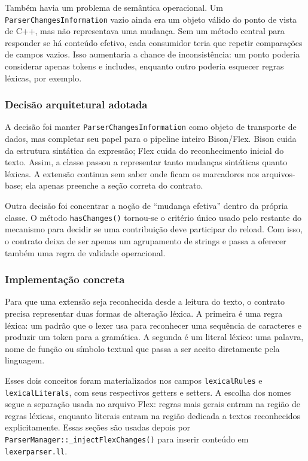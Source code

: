 \documentclass[12pt,a4paper]{article}
\begin{document}
Tamb\'em havia um problema de sem\^antica operacional. Um \texttt{ParserChangesInformation} vazio ainda era um objeto v\'alido do ponto de vista de C++, mas n\~ao representava uma mudan\c{c}a. Sem um m\'etodo central para responder se h\'a conte\'udo efetivo, cada consumidor teria que repetir compara\c{c}\~oes de campos vazios. Isso aumentaria a chance de inconsist\^encia: um ponto poderia considerar apenas tokens e includes, enquanto outro poderia esquecer regras l\'exicas, por exemplo.

\subsubsection{Decis\~ao arquitetural adotada}

A decis\~ao foi manter \texttt{ParserChangesInformation} como objeto de transporte de dados, mas completar seu papel para o pipeline inteiro Bison/Flex. Bison cuida da estrutura sint\'atica da express\~ao; Flex cuida do reconhecimento inicial do texto. Assim, a classe passou a representar tanto mudan\c{c}as sint\'aticas quanto l\'exicas. A extens\~ao continua sem saber onde ficam os marcadores nos arquivos-base; ela apenas preenche a se\c{c}\~ao correta do contrato.

Outra decis\~ao foi concentrar a no\c{c}\~ao de ``mudan\c{c}a efetiva'' dentro da pr\'opria classe. O m\'etodo \texttt{hasChanges()} tornou-se o crit\'erio \'unico usado pelo restante do mecanismo para decidir se uma contribui\c{c}\~ao deve participar do reload. Com isso, o contrato deixa de ser apenas um agrupamento de strings e passa a oferecer tamb\'em uma regra de validade operacional.

\subsubsection{Implementa\c{c}\~ao concreta}

Para que uma extens\~ao seja reconhecida desde a leitura do texto, o contrato precisa representar duas formas de altera\c{c}\~ao l\'exica. A primeira \'e uma regra l\'exica: um padr\~ao que o lexer usa para reconhecer uma sequ\^encia de caracteres e produzir um token para a gram\'atica. A segunda \'e um literal l\'exico: uma palavra, nome de fun\c{c}\~ao ou s\'imbolo textual que passa a ser aceito diretamente pela linguagem.

Esses dois conceitos foram materializados nos campos \texttt{lexicalRules} e \texttt{lexicalLiterals}, com seus respectivos getters e setters. A escolha dos nomes segue a separa\c{c}\~ao usada no arquivo Flex: regras mais gerais entram na regi\~ao de regras l\'exicas, enquanto literais entram na regi\~ao dedicada a textos reconhecidos explicitamente. Essas se\c{c}\~oes s\~ao usadas depois por \texttt{ParserManager::\_injectFlexChanges()} para inserir conte\'udo em \texttt{lexerparser.ll}.
\end{document}

